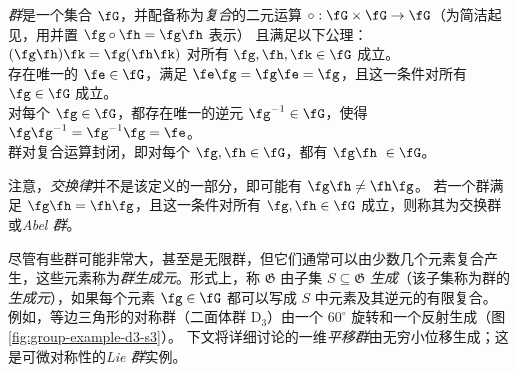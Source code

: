 

\begin{tcolorbox}[width=\linewidth,
                  boxsep=0pt,
                  left=7.5pt,
                  right=7.5pt,
                  top=7.5pt,
                  bottom=7.5pt,
                  arc=0pt,
                  boxrule=0pt,toprule=0pt,
                  colback=boxgray,
                  ]%
{\em 群}是一个集合 $\fG$，并配备称为{\em 复合}的二元运算 $\circ : \fG \times \fG \rightarrow \fG$（为简洁起见，用并置 $\fg \circ \fh = \fg \fh$ 表示）
且满足以下公理：\vspace{3mm}\\
    $(\fg \fh) \fk = \fg (\fh \fk)$ 对所有 $\fg, \fh, \fk \in \fG$ 成立。\vspace{2mm}\\
    存在唯一的 $\fe \in \fG$，满足 $\fe \fg = \fg \fe = \fg$，且这一条件对所有 $\fg \in \fG$ 成立。\vspace{2mm}\\
    对每个 $\fg \in \fG$，都存在唯一的逆元 $\fg^{-1} \in \fG$，使得 $\fg \fg^{-1} = \fg^{-1} \fg = \fe$。\vspace{2mm}\\
    群对复合运算封闭，即对每个 $\fg, \fh \in \fG$，都有 $\fg \fh \ \in \fG$。

\end{tcolorbox}
注意，\emph{交换律}并不是该定义的一部分，即可能有 $\fg \fh \neq \fh \fg$。
若一个群满足 $\fg \fh = \fh \fg$，且这一条件对所有 $\fg, \fh \in \fG$ 成立，则称其为交换群或{\em Abel 群}。

尽管有些群可能非常大，甚至是无限群，但它们通常可以由少数几个元素复合产生，这些元素称为{\em 群生成元}。形式上，称 $\mathfrak{G}$ 由子集 $S \subseteq \mathfrak{G}$ {\em 生成}（该子集称为群的{\em 生成元}），如果每个元素 $\fg \in \fG$ 都可以写成 $S$ 中元素及其逆元的有限复合。
%
例如，等边三角形的对称群（二面体群 $\mathrm{D}_3$）由一个 $60^\circ$ 旋转和一个反射生成（图 \ref{fig:group-example-d3-s3}）。
%
下文将详细讨论的一维{\em 平移群}由无穷小位移生成；这是可微对称性的{\em Lie 群}实例。



